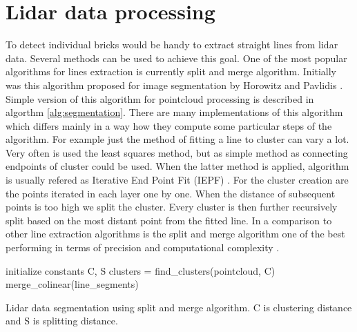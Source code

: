 \section{Lidar data processing}

To detect individual bricks would be handy to extract straight lines from lidar data. Several methods can be used to achieve this goal. One of the most popular algorithms for lines extraction is currently split and merge algorithm. Initially was this algorithm proposed for image segmentation by Horowitz and Pavlidis \cite{horowitz1974}. Simple version of this algorithm for pointcloud processing is described in algorthm \ref{alg:segmentation}. There are many implementations of this algorithm which differs mainly in a way how they compute some particular steps of the algorithm. For example just the method of fitting a line to cluster can vary a lot. Very often is used the least squares method, but as simple method as connecting endpoints of cluster could be used. When the latter method is applied, algorithm is usually refered as Iterative End Point Fit (IEPF) \cite{siadat1997}. For the cluster creation are the points iterated in each layer one by one. When the distance of subsequent points is too high we split the cluster. Every cluster is then further recursively split based on the most distant point from the fitted line. In a comparison to other line extraction algorithms is the split and merge algorithm one of the best performing in terms of precision and computational complexity \cite{nguyen2006}.
\begin{algorithm}[]
initialize constants C, S\;
  clusters = find\_clusters(pointcloud, C)\;
merge\_colinear(line\_segments)\;
 
 \caption{Lidar data segmentation using split and merge algorithm. C is clustering distance and S is splitting distance.}
 \label{alg:segmentation}
\end{algorithm}


